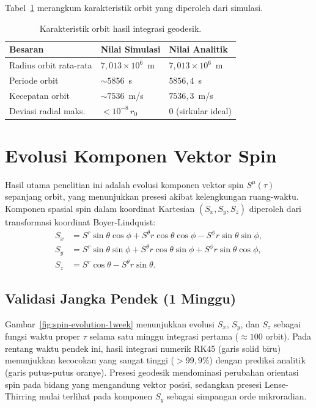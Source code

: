 Tabel~\ref{tab:hasil-orbit} merangkum karakteristik orbit
yang diperoleh dari simulasi.

\begin{table}[ht]
\centering
\caption{Karakteristik orbit hasil integrasi geodesik.}
\label{tab:hasil-orbit}
\begin{tabular}{lll}
\toprule
\textbf{Besaran} & \textbf{Nilai Simulasi} & \textbf{Nilai Analitik} \\
\midrule
Radius orbit rata-rata & $7{,}013 \times 10^6$~m & $7{,}013 \times 10^6$~m \\
Periode orbit & $\sim 5856$~s & $5856{,}4$~s \\
Kecepatan orbit & $\sim 7536$~m/s & $7536{,}3$~m/s \\
Deviasi radial maks. & $< 10^{-8}\, r_0$ & $0$ (sirkular ideal) \\
\bottomrule
\end{tabular}
\end{table}


\section{Evolusi Komponen Vektor Spin}
\label{sec:evolusi-spin}

Hasil utama penelitian ini adalah evolusi komponen vektor spin
$S^\mu(\tau)$ sepanjang orbit, yang menunjukkan presesi akibat
kelengkungan ruang-waktu.
Komponen spasial spin dalam koordinat Kartesian
$(S_x, S_y, S_z)$ diperoleh dari transformasi koordinat
Boyer-Lindquist:
\begin{align}
    S_x &= S^r \sin\theta\cos\phi + S^\theta r\cos\theta\cos\phi
          - S^\phi r\sin\theta\sin\phi,
    \label{eq:Sx} \\
    S_y &= S^r \sin\theta\sin\phi + S^\theta r\cos\theta\sin\phi
          + S^\phi r\sin\theta\cos\phi,
    \label{eq:Sy} \\
    S_z &= S^r \cos\theta - S^\theta r\sin\theta.
    \label{eq:Sz}
\end{align}

\subsection{Validasi Jangka Pendek (1 Minggu)}

Gambar~\ref{fig:spin-evolution-1week} menunjukkan evolusi
$S_x$, $S_y$, dan $S_z$ sebagai fungsi waktu proper $\tau$
selama satu minggu integrasi pertama ($\approx 100$ orbit).
Pada rentang waktu pendek ini, hasil integrasi numerik RK45 (garis solid biru)
menunjukkan kecocokan yang sangat tinggi ($>99{,}9\%$) dengan prediksi
analitik (garis putus-putus oranye). Presesi geodesik mendominasi
perubahan orientasi spin pada bidang yang mengandung vektor posisi,
sedangkan presesi Lense-Thirring mulai terlihat pada komponen $S_y$
sebagai simpangan orde mikroradian.


